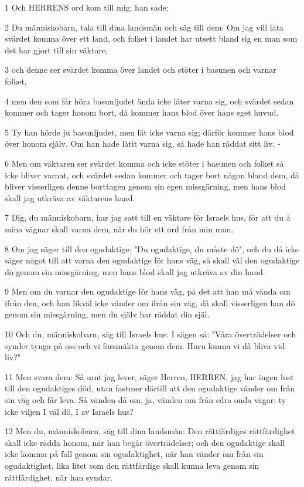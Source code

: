 \par 1 Och HERRENS ord kom till mig; han sade:
\par 2 Du människobarn, tala till dina landsmän och säg till dem: Om jag vill låta svärdet komma över ett land, och folket i landet har utsett bland sig en man som det har gjort till sin väktare,
\par 3 och denne ser svärdet komma över landet och stöter i basunen och varnar folket,
\par 4 men den som får höra basunljudet ända icke låter varna sig, och svärdet sedan kommer och tager honom bort, då kommer hans blod över hans eget huvud.
\par 5 Ty han hörde ju basunljudet, men lät icke varna sig; därför kommer hans blod över honom själv. Om han hade låtit varna sig, så hade han räddat sitt liv. -
\par 6 Men om väktaren ser svärdet komma och icke stöter i basunen och folket så icke bliver varnat, och svärdet sedan kommer och tager bort någon bland dem, då bliver visserligen denne borttagen genom sin egen missgärning, men hans blod skall jag utkräva av väktarens hand.
\par 7 Dig, du människobarn, har jag satt till en väktare för Israels hus, för att du å mina vägnar skall varna dem, när du hör ett ord från min mun.
\par 8 Om jag säger till den ogudaktige: "Du ogudaktige, du måste dö", och du då icke säger något till att varna den ogudaktige för hans väg, så skall väl den ogudaktige dö genom sin missgärning, men hans blod skall jag utkräva av din hand.
\par 9 Men om du varnar den ogudaktige för hans väg, på det att han må vända om ifrån den, och han likväl icke vänder om ifrån sin väg, då skall visserligen han dö genom sin missgärning, men du själv har räddat din själ.
\par 10 Och du, människobarn, säg till Israels hus: I sägen så: "Våra överträdelser och synder tynga på oss och vi försmäkta genom dem. Huru kunna vi då bliva vid liv?"
\par 11 Men svara dem: Så sant jag lever, säger Herren, HERREN, jag har ingen lust till den ogudaktiges död, utan fastmer därtill att den ogudaktige vänder om från sin väg och får leva. Så vänden då om, ja, vänden om från edra onda vägar; ty icke viljen I väl dö, I av Israels hus?
\par 12 Men du, människobarn, säg till dina landsmän: Den rättfärdiges rättfärdighet skall icke rädda honom, när han begår överträdelser; och den ogudaktige skall icke komma på fall genom sin ogudaktighet, när han vänder om från sin ogudaktighet, lika litet som den rättfärdige skall kunna leva genom sin rättfärdighet, när han syndar.
